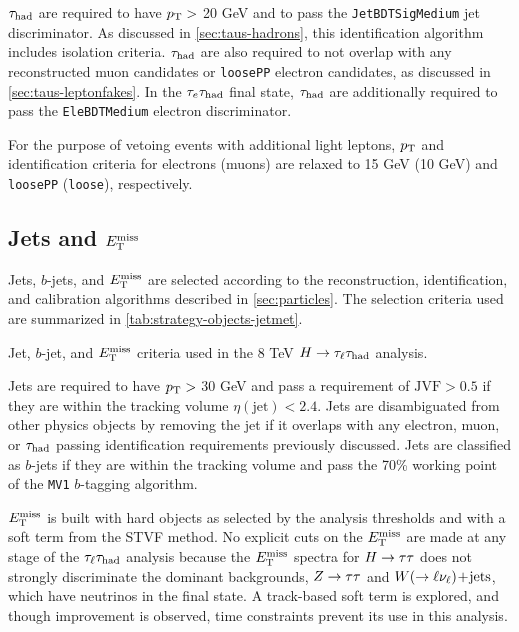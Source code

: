 $\tau_\text{had}$ are required to have $p_{\mathrm{T}} >$ 20 GeV and to pass the \texttt{JetBDTSigMedium} jet discriminator. As discussed in \cref{sec:taus-hadrons}, this identification algorithm includes isolation criteria. $\tau_\text{had}$ are also required to not overlap with any reconstructed muon candidates or \texttt{loosePP} electron candidates, as discussed in \cref{sec:taus-leptonfakes}. In the $\tau_e \tau_\text{had}$ final state, $\tau_\text{had}$ are additionally required to pass the \texttt{EleBDTMedium} electron discriminator.

For the purpose of vetoing events with additional light leptons, $p_{\mathrm{T}}$ and identification criteria for electrons (muons) are relaxed to 15 GeV (10 GeV) and \texttt{loosePP} (\texttt{loose}), respectively.

\subsection{Jets and $E_{\mathrm{T}}^{\mathrm{miss}}$}
\label{sec:strategy-hadronic}

Jets, $b$-jets, and $E_{\mathrm{T}}^{\mathrm{miss}}$ are selected according to the reconstruction, identification, and calibration algorithms described in \cref{sec:particles}. The selection criteria used are summarized in \cref{tab:strategy-objects-jetmet}.

\begin{table}[bp]
  \centering
  \renewcommand{\arraystretch}{1.4}
  \caption{Jet, $b$-jet, and $E_{\mathrm{T}}^{\mathrm{miss}}$ criteria used in the 8 TeV $H\rightarrow\tau_\ell\tau_\text{had}$ analysis.}
  
  \label{tab:strategy-objects-jetmet}
\end{table}

Jets are required to have $p_{\mathrm{T}} >$ 30 GeV and pass a requirement of $\text{JVF} > 0.5$ if they are within the tracking volume $\eta(\text{jet}) < 2.4$. Jets are disambiguated from other physics objects by removing the jet if it overlaps with any electron, muon, or $\tau_\text{had}$ passing identification requirements previously discussed. Jets are classified as $b$-jets if they are within the tracking volume and pass the 70\% working point of the \texttt{MV1} $b$-tagging algorithm.

$E_{\mathrm{T}}^{\mathrm{miss}}$ is built with hard objects as selected by the analysis thresholds and with a soft term from the STVF method. No explicit cuts on the $E_{\mathrm{T}}^{\mathrm{miss}}$ are made at any stage of the $\tau_\ell\tau_\text{had}$ analysis because the $E_{\mathrm{T}}^{\mathrm{miss}}$ spectra for $H\rightarrow\tau\tau$ does not strongly discriminate the dominant backgrounds, $Z\rightarrow\tau\tau$ and $W (\rightarrow \ell\nu_\ell)\!+\!\text{jets}$, which have neutrinos in the final state. A track-based soft term is explored, and though improvement is observed, time constraints prevent its use in this analysis.


